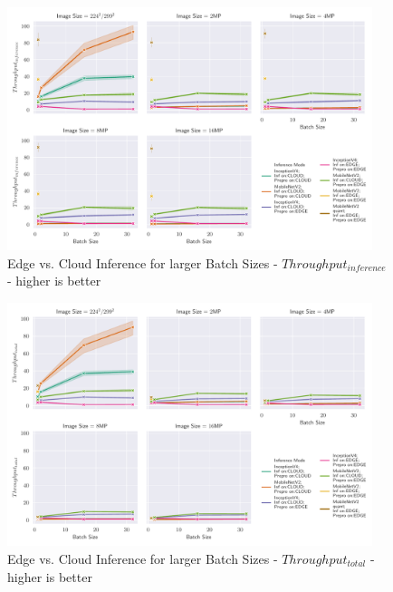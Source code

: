 \begin{figure}[!htb]
\centering
\includegraphics[width=0.95\textwidth]{./Bilder/single_plots/batch_size_plots/Effects_of_Batch_size_Inference_Throughput.pdf}
\caption{Edge vs. Cloud Inference for larger Batch Sizes -  $Throughput_{inference}$ - higher is better}
\label{fig:BatchSizeInferenceThroughput}
\end{figure}
\begin{figure}[!htb]
\centering
\includegraphics[width=0.95\textwidth]{./Bilder/single_plots/batch_size_plots/Effects_of_Batch_size_Total_Throughput_(Preprocessing_+_Inference).pdf}
\caption{Edge vs. Cloud Inference for larger Batch Sizes -  $Throughput_{total}$ - higher is better}
\label{fig:BatchSizeTotalThroughput}
\end{figure}


\FloatBarrier

